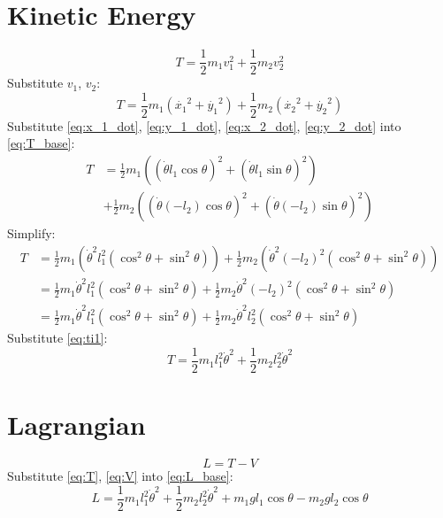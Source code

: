 \documentclass[titlepage]{article}
\numberwithin{equation}{section}
\begin{document}
\section{Kinetic Energy}
\begin{equation}
T = \frac{1}{2} m_1 v_1^2 + \frac{1}{2} m_2 v_2^2
\end{equation}
Substitute $v_1$, $v_2$:
\begin{equation} \label{eq:T_base}
T = \frac{1}{2} m_1 (\dot{x_1}^2 + \dot{y_1}^2) + \frac{1}{2} m_2 (\dot{x_2}^2 + \dot{y_2}^2)
\end{equation}
Substitute \ref{eq:x_1_dot}, \ref{eq:y_1_dot}, \ref{eq:x_2_dot}, \ref{eq:y_2_dot} into \ref{eq:T_base}:
\begin{align}
T &= \frac{1}{2} m_1 ((\dot{\theta} l_1 \cos \theta)^2 + (\dot{\theta} l_1 \sin \theta)^2) \nonumber \\
  &+ \frac{1}{2} m_2 ((\dot{\theta} (-l_2) \cos \theta)^2 + (\dot{\theta} (-l_2) \sin \theta)^2)
\end{align}
Simplify:
\begin{align}
T &= \frac{1}{2} m_1 (\dot{\theta}^2 l_1^2 (\cos^2 \theta + \sin^2 \theta)) + \frac{1}{2} m_2 (\dot{\theta}^2 (-l_2)^2 (\cos^2 \theta + \sin^2 \theta)) \\
  &= \frac{1}{2} m_1 \dot{\theta}^2 l_1^2 (\cos^2 \theta + \sin^2 \theta) + \frac{1}{2} m_2 \dot{\theta}^2 (-l_2)^2 (\cos^2 \theta + \sin^2 \theta) \\
  &= \frac{1}{2} m_1 \dot{\theta}^2 l_1^2 (\cos^2 \theta + \sin^2 \theta) + \frac{1}{2} m_2 \dot{\theta}^2 l_2^2 (\cos^2 \theta + \sin^2 \theta)
\end{align}
Substitute \ref{eq:ti1}:
\begin{equation} \label{eq:T}
T = \frac{1}{2} m_1 l_1^2 \dot{\theta}^2 + \frac{1}{2} m_2 l_2^2 \dot{\theta}^2
\end{equation}

\section{Lagrangian}
\begin{equation} \label{eq:L_base}
L = T - V
\end{equation}
Substitute \ref{eq:T}, \ref{eq:V} into \ref{eq:L_base}:
\begin{equation}
L = \frac{1}{2} m_1 l_1^2 \dot{\theta}^2 + \frac{1}{2} m_2 l_2^2 \dot{\theta}^2 + m_1 g l_1 \cos \theta - m_2 g l_2 \cos \theta
\end{equation}
\end{document}
